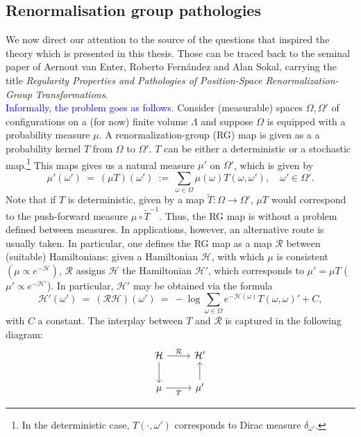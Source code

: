 \documentclass[12pt]{article}
\renewcommand{\H}{\mathcal{H}}
\newcommand{\RR}{\mathcal{R}}
\newcommand{\ra}{\rightarrow}
\newcommand{\pika}{\boldsymbol{\cdot}}
\newcommand{\1}{\mathbbm{1}}
\newcommand{\5}{\vspace{0.5cm}}
\renewcommand{\tilde}{\widetilde}
\theoremstyle{definition}
\begin{document}

\subsection{Renormalisation group pathologies}

We now direct our attention to the source of the questions that inspired the theory which is presented in this thesis. Those can be traced back to the seminal paper of Aernout van Enter, Roberto Fern\'andez and Alan Sokal, carrying the title \textit{Regularity Properties and Pathologies of Position-Space Renormalization-Group Transformations}. \\

\textcolor{blue}{Informally, the problem goes as follows.} Consider (measurable) spaces $\Omega,\Omega'$ of configurations on a (for now) finite volume $\Lambda$ and suppose $\Omega$ is equipped with a probability measure $\mu$. A renormalization-group (RG) map is given as a a probability kernel $T$ from $\Omega$ to $\Omega'$. $T$ can be either a deterministic or a stochastic map.\footnote{In the deterministic case, $T(\pika,\omega')$ corresponds to Dirac measure $\delta_{\omega'}$.} This maps gives us a natural measure $\mu'$ on $\Omega'$, which is given by
$$\mu'(\omega') ~=~ (\mu T)(\omega') ~:=~ \sum_{\omega\in\Omega}\mu(\omega)T(\omega,\omega'), \quad \omega'\in\Omega'.$$
Note that if $T$ is deterministic, given by a map $\tilde{T}:\Omega\ra\Omega'$, $\mu T$ would correspond to the push-forward measure $\mu\circ \tilde{T}^{-1}$. Thus, the RG map is without a problem defined between measures. In applications, however, an alternative route is usually taken. In particular, one defines the RG map as a map $\RR$ between (suitable) Hamiltonians: given a Hamiltonian $\H$, with which $\mu$ is consistent $(\mu\propto e^{-\H})$, $\RR$ assigns $\H$ the Hamiltonian $\H'$, which corresponds to $\mu'=\mu T$ ($\mu'\propto e^{-\H'}$). In particular, $\H'$ may be obtained via the formula
$$\H'(\omega') ~=~ (\RR\H)(\omega') ~=~ -\log\sum_{\omega\in\Omega} e^{-\H(\omega)}T(\omega,\omega)' + C,$$
with $C$ a constant. The interplay between $T$ and $\RR$ is captured in the following diagram:
$$\begin{tikzcd}
\H & {\H'} \\
	\mu & {\mu'}
	\arrow["\RR", from=1-1, to=1-2]
	\arrow[from=1-1, to=2-1]
	\arrow["T"', from=2-1, to=2-2]
	\arrow[from=2-2, to=1-2]
\end{tikzcd}$$
\end{document}

